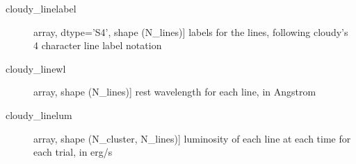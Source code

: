 \documentclass[letterpaper,10pt,english]{sphinxmanual}
\begin{document}
\begin{fulllineitems}
\begin{description}
\begin{description}
\item[{cloudy\_linelabel}] \leavevmode{[}array, dtype='S4', shape (N\_lines){]}
labels for the lines, following cloudy's 4 character line label
notation

\item[{cloudy\_linewl}] \leavevmode{[}array, shape (N\_lines){]}
rest wavelength for each line, in Angstrom

\item[{cloudy\_linelum}] \leavevmode{[}array, shape (N\_cluster, N\_lines){]}
luminosity of each line at each time for each trial, in erg/s

\end{description}

\end{description}

\end{fulllineitems}

\end{document}
